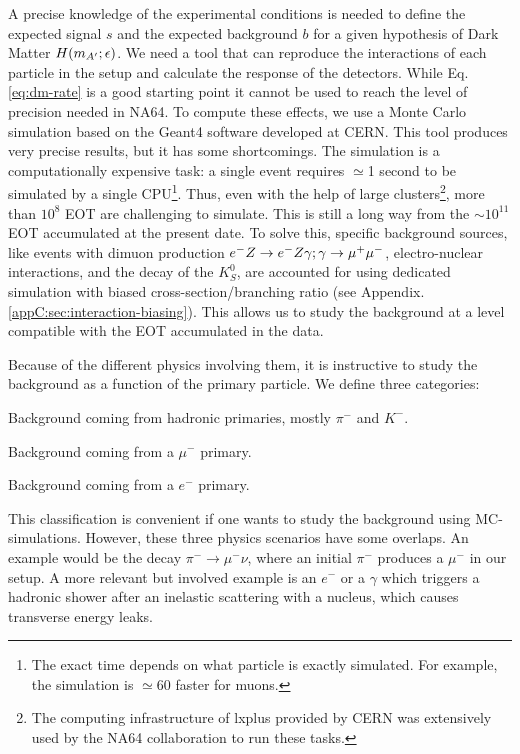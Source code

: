 A precise knowledge of the experimental conditions is needed to define the expected signal $s$ and the expected background $b$ for a given hypothesis of Dark Matter $H(m_{A'};\epsilon)$. We need a tool that can reproduce the interactions of each particle in the setup and calculate the response of the detectors. While Eq.\ref{eq:dm-rate} is a good starting point it cannot be used to reach the level of precision needed in NA64. To compute these effects, we use a Monte Carlo simulation based on the Geant4 software \cite{AGOSTINELLI2003250,1610988} developed at CERN. This tool produces very precise results, but it has some shortcomings. The simulation is a computationally expensive task: a single event requires $\simeq$1 second to be simulated by a single CPU\footnote{The exact time depends on what particle is exactly simulated. For example, the simulation is $\simeq$60 faster for muons.}. Thus, even with the help of large clusters\footnote{The computing infrastructure of lxplus provided by CERN was extensively used by the NA64 collaboration to run these tasks.}, more than $10^8$ EOT are challenging to simulate. This is still a long way from the $\sim 10^{11}$ EOT accumulated at the present date. 
To solve this, specific background sources, like events with dimuon production $e^- Z \to e^- Z \gamma; \gamma \to \mu^+ \mu^-$, electro-nuclear interactions, and the decay of the $K^0_S$, are accounted for using dedicated simulation with biased cross-section/branching ratio (see Appendix.\ref{appC:sec:interaction-biasing}). This allows us to study the background at a level compatible with the EOT accumulated in the data.

Because of the different physics involving them, it is instructive to study the background as a function of the primary particle. We define three categories:
\begin{description}[leftmargin=!,labelwidth=\widthof{\bfseries Electronic background}]
\item[Hadronic background] Background coming from hadronic primaries, mostly $\pi^-$ and $K^-$.
\item[Muonic background] Background coming from a $\mu^-$ primary.
\item[Electronic background] Background coming from a $e^-$ primary.
\end{description}
This classification is convenient if one wants to study the background using MC-simulations. However, these three physics scenarios have some overlaps. An example would be the decay $\pi^- \rightarrow \mu^-\nu$, where an initial $\pi^-$ produces a $\mu^-$ in our setup. A more relevant but involved example is an $e^-$ or a $\gamma$ which triggers a hadronic shower after an inelastic scattering with a nucleus, which causes transverse energy leaks.


